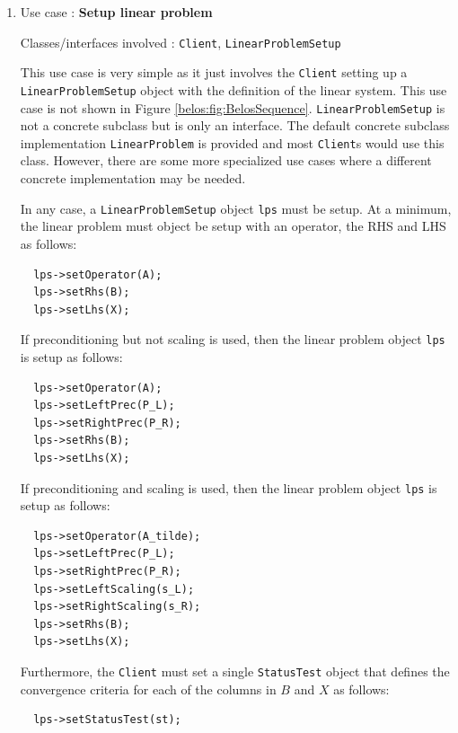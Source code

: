 \documentclass[pdf,ps2pdf,11pt]{SANDreport}
\begin{document}
\begin{enumerate}

\item Use case : \textbf{Setup linear problem}

{}\noindent{}Classes/interfaces involved : {}\texttt{Client},
{}\texttt{Linear\-Problem\-Setup}

This use case is very simple as it just involves the {}\texttt{Client}
setting up a {}\texttt{Linear\-Problem\-Setup} object with the
definition of the linear system.  This use case is not shown in Figure
{}\ref{belos:fig:BelosSequence}.  {}\texttt{Linear\-Problem\-Setup} is
not a concrete subclass but is only an interface.  The default
concrete subclass implementation {}\texttt{Linear\-Problem} is
provided and most {}\texttt{Client}s would use this class.  However,
there are some more specialized use cases where a different concrete
implementation may be needed.

In any case, a {}\texttt{Linear\-Problem\-Setup} object {}\texttt{lps}
must be setup.  At a minimum, the linear problem must object be setup
with an operator, the RHS and LHS as follows:

{\scriptsize\begin{verbatim}
  lps->setOperator(A);
  lps->setRhs(B);
  lps->setLhs(X);
\end{verbatim}}

If preconditioning but not scaling is used, then the linear problem
object {}\texttt{lps} is setup as follows:

{\scriptsize\begin{verbatim}
  lps->setOperator(A);
  lps->setLeftPrec(P_L);
  lps->setRightPrec(P_R);
  lps->setRhs(B);
  lps->setLhs(X);
\end{verbatim}}

If preconditioning and scaling is used, then the linear problem object
{}\texttt{lps} is setup as follows:

{\scriptsize\begin{verbatim}
  lps->setOperator(A_tilde);
  lps->setLeftPrec(P_L);
  lps->setRightPrec(P_R);
  lps->setLeftScaling(s_L);
  lps->setRightScaling(s_R);
  lps->setRhs(B);
  lps->setLhs(X);
\end{verbatim}}

Furthermore, the {}\texttt{Client} must set a single
{}\texttt{Status\-Test} object that defines the convergence criteria
for each of the columns in $B$ and $X$ as follows:

{\scriptsize\begin{verbatim}
  lps->setStatusTest(st);
\end{verbatim}}


\end{enumerate}
\end{document}
